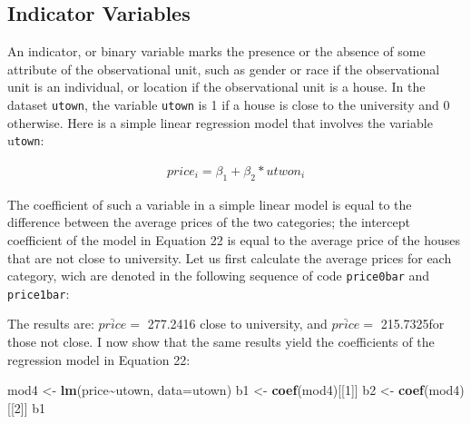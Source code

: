 \documentclass[
]{book}
\newenvironment{Shaded}{\begin{snugshade}}{\end{snugshade}}
\newcommand{\AttributeTok}[1]{\textcolor[rgb]{0.13,0.29,0.53}{#1}}
\newcommand{\DecValTok}[1]{\textcolor[rgb]{0.00,0.00,0.81}{#1}}
\newcommand{\FunctionTok}[1]{\textcolor[rgb]{0.13,0.29,0.53}{\textbf{#1}}}
\newcommand{\NormalTok}[1]{#1}
\newcommand{\OtherTok}[1]{\textcolor[rgb]{0.56,0.35,0.01}{#1}}
\newcommand{\SpecialCharTok}[1]{\textcolor[rgb]{0.81,0.36,0.00}{\textbf{#1}}}
\begin{document}
\hypertarget{indicator-variables}{%
\subsection{Indicator Variables}\label{indicator-variables}}

An indicator, or binary variable marks the presence or the absence of some attribute of the observational unit, such as gender or race if the observational unit is an individual, or location if the observational unit is a house. In the dataset \texttt{utown}, the variable \texttt{utown} is 1 if a house is close to the university and 0 otherwise. Here is a simple linear regression model that involves the variable u\texttt{town}:

\[
\begin{align}
price_i= \beta_1+\beta_2*utwon_i
\end{align}
\]

The coefficient of such a variable in a simple linear model is equal to the difference between the average prices of the two categories; the intercept coefficient of the model in Equation 22 is equal to the average price of the houses that are not close to university. Let us first calculate the average prices for each category, wich are denoted in the following sequence of code \texttt{price0bar} and \texttt{price1bar}:

\begin{Shaded}
\end{Shaded}

The results are: \(\bar{price}=\) 277.2416 close to university, and \(\bar{price}=\) 215.7325for those not close. I now show that the same results yield the coefficients of the regression model in Equation 22:

\begin{Shaded}
\begin{Highlighting}[]
\NormalTok{mod4 }\OtherTok{\textless{}{-}} \FunctionTok{lm}\NormalTok{(price}\SpecialCharTok{\textasciitilde{}}\NormalTok{utown, }\AttributeTok{data=}\NormalTok{utown)}
\NormalTok{b1 }\OtherTok{\textless{}{-}} \FunctionTok{coef}\NormalTok{(mod4)[[}\DecValTok{1}\NormalTok{]] }
\NormalTok{b2 }\OtherTok{\textless{}{-}} \FunctionTok{coef}\NormalTok{(mod4)[[}\DecValTok{2}\NormalTok{]]}
\NormalTok{b1}
\end{Highlighting}
\end{Shaded}
\end{document}
